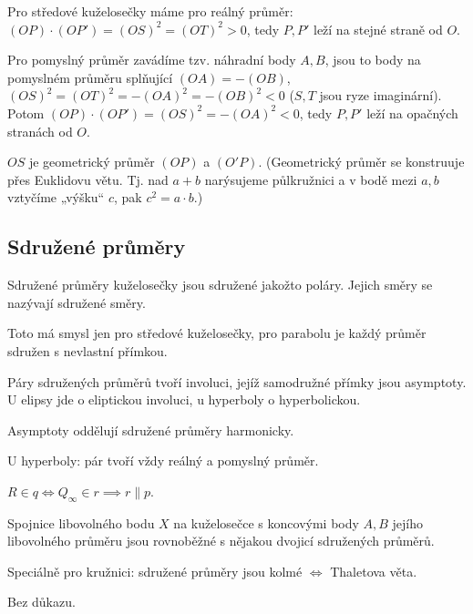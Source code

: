 \documentclass[12pt]{article}					%
\begin{document}
\begin{poznamka}[Použití]
	Pro středové kuželosečky máme pro reálný průměr: $(OP)·(OP') = (OS)^2 = (OT)^2 > 0$, tedy $P, P'$ leží na stejné straně od $O$.

	Pro pomyslný průměr zavádíme tzv. náhradní body $A, B$, jsou to body na pomyslném průměru splňující $(OA) = - (OB)$, $(OS)^2 = (OT)^2 = -(OA)^2 = -(OB)^2 < 0$ ($S, T$ jsou ryze imaginární). Potom $(OP)·(OP') = (OS)^2 = -(OA)^2 < 0$, tedy $P, P'$ leží na opačných stranách od $O$.
\end{poznamka}

\begin{dusledek}
	$OS$ je geometrický průměr $(OP)$ a $(O'P)$. (Geometrický průměr se konstruuje přes Euklidovu větu. Tj. nad $a+b$ narýsujeme půlkružnici a v bodě mezi $a,b$ vztyčíme „výšku“ $c$, pak $c^2 = a·b$.)
\end{dusledek}

\subsection{Sdružené průměry}
\begin{definice}
	Sdružené průměry kuželosečky jsou sdružené jakožto poláry. Jejich směry se nazývají sdružené směry.
\end{definice}

\begin{poznamka}
	Toto má smysl jen pro středové kuželosečky, pro parabolu je každý průměr sdružen s nevlastní přímkou.

	Páry sdružených průměrů tvoří involuci, jejíž samodružné přímky jsou asymptoty. U elipsy jde o eliptickou involuci, u hyperboly o hyperbolickou.

	Asymptoty oddělují sdružené průměry harmonicky.

	U hyperboly: pár tvoří vždy reálný a pomyslný průměr.

	$R \in q \Leftrightarrow Q_∞ \in r \implies r \parallel p$.
\end{poznamka}

\begin{veta}
	Spojnice libovolného bodu $X$ na kuželosečce s koncovými body $A, B$ jejího libovolného průměru jsou rovnoběžné s nějakou dvojicí sdružených průměrů.

	Speciálně pro kružnici: sdružené průměry jsou kolmé $\Leftrightarrow$ Thaletova věta.

	\begin{dukazin}
		Bez důkazu.
	\end{dukazin}
\end{veta}
\end{document}
